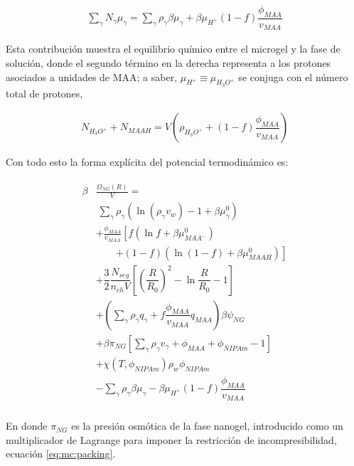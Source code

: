 	
	\begin{align}
		\sum_\gamma N_\gamma \mu_\gamma = \sum_{\gamma }{\rho_\gamma\beta\mu_\gamma}
		+ \beta\mu_{H^+}(1-f)\dfrac{\phi_{MAA}}{v_{MAA}}
	\end{align}
	
	Esta contribuci\'on muestra el equilibrio qu\'imico entre el microgel y la fase de soluci\'on, donde el segundo t\'ermino en la derecha representa a los protones asociados a unidades de MAA;
	a saber, $\mu_{H^+}\equiv\mu_{H_3O^+}$ se conjuga con el n\'umero total de protones,
	
	\begin{align}
		N_{H_3O^+}+N_{MAAH}=V\left(\rho_{H_3O^+}+(1-f)\dfrac{\phi_{MAA}}{v_{MAA}}\right)
		\label{eq:mc:equilibrio}
	\end{align}
	
	
	
	Con todo esto la forma expl\'icita del potencial termodin\'amico es:
	
	
	
	
	\begin{align}
		\begin{aligned}
			\beta&\frac{\Omega_{NG}(R)}{V}=\\& ~ \sum_{\gamma} \rho_\gamma\left(\ln\left(\rho_\gamma v_w\right) -1 + \beta\mu^0_\gamma\right) \\
			& + \frac{\phi_{MAA}}{v_{MAA}} \left[f(\ln f+ \beta\mu^0_{MAA^-})\right.\\
			&\qquad\left.+(1-f)(\ln (1-f)+\beta\mu^0_{MAAH})\right] \\
			& + \dfrac{3}{2}\dfrac{N_{seg}}{n_{ch} V}\left[\left(\dfrac{R}{R_0}\right)^2 - \ln\dfrac{R}{R_0} -1\right] \\
			& +  \left(\sum_{\gamma } {\rho_\gamma q_\gamma + f\dfrac{\phi_{MAA}}{v_{MAA}}q_{MAA}}\right)\beta\psi_{NG}\\
			& +\beta\pi_{NG} \left[ \sum_{\gamma } \rho_\gamma v_\gamma  + \phi_{MAA} + \phi_{NIPAm} -1 \right] \\
			& + \chi (T, \phi_{NIPAm})\rho_w \phi_{NIPAm} \\
			& -\sum_{\gamma }{\rho_\gamma\beta\mu_\gamma}
			-\beta\mu_{H^+}(1-f)\dfrac{\phi_{MAA}}{v_{MAA}}\\
		\end{aligned}
		\label{eq:mc:free-energy}
	\end{align}
	
	
	
	
	\noindent En donde $\pi_{NG}$ es la presi\'on osm\'otica de la fase nanogel, introducido como un multiplicador de Lagrange para imponer la restricci\'on de incompresibilidad, ecuaci\'on \ref{eq:mc:packing}.
	
